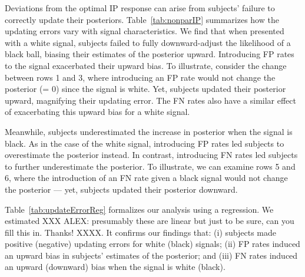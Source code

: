 \documentclass[12pt,a4paper]{article}
\newcommand{\agt}[1]{{\color{OliveGreen}#1}}
\begin{document}
Deviations from the optimal IP response can arise from subjects' failure to correctly update their posteriors. Table~\ref{tab:nonparIP} summarizes how the updating errors vary with signal characteristics. We find that when presented with a white signal, subjects failed to fully downward-adjust the likelihood of a black ball, biasing their estimates of the posterior upward. Introducing FP rates to the signal exacerbated their upward bias. To illustrate, consider the change between rows 1 and 3, where introducing an FP rate would not change the posterior (= 0) since the signal is white. Yet, subjects updated their posterior upward, magnifying their updating error. The FN rates also have a similar effect of exacerbating this upward bias for a white signal.

Meanwhile, subjects underestimated the increase in posterior when the signal is black. As in the case of the white signal, introducing FP rates led subjects to overestimate the posterior instead. In contrast, introducing FN rates led subjects to further underestimate the posterior. To illustrate, we can examine rows 5 and 6, where the introduction of an FN rate given a black signal would not change the posterior --- yet, subjects updated their posterior downward.

Table~\ref{tab:updateErrorReg} formalizes our analysis using a regression. We estimated \agt{XXX ALEX: presumably these are linear but just to be sure, can you fill this in. Thanks! XXXX}. It confirms our findings that: (i) subjects made positive (negative) updating errors for white (black) signals; (ii) FP rates induced an upward bias in subjects' estimates of the posterior; and (iii) FN rates induced an upward (downward) bias when the signal is white (black). 

\end{document}
